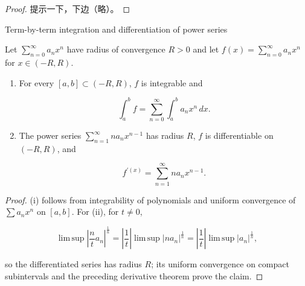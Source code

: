 \begin{proof}

提示一下，下边（略）。

\end{proof}

\begin{theorem}{Term-by-term integration and differentiation of power series}

Let \(\sum_{n = 0}^{\infty}a_{n}x^{n}\) have radius of convergence \(R > 0\) and let \(f(x) = \sum_{n = 0}^{\infty}a_{n}x^{n}\) for \(x \in \left( {- R,R} \right)\).

\begin{enumerate}
\item
  For every \(\left\lbrack {a,b} \right\rbrack \subset \left( {- R,R} \right)\), \(f\) is integrable and

  \[\int_{a}^{b}f = \sum\limits_{n = 0}^{\infty}\int_{a}^{b}a_{n}x^{n}\, dx.\]
\item
  The power series \(\sum_{n = 1}^{\infty}na_{n}x^{n - 1}\) has radius \(R\), \(f\) is differentiable on \(\left( {- R,R} \right)\), and

  \[f^{'{(x)}} = \sum\limits_{n = 1}^{\infty}na_{n}x^{n - 1}.\]
\end{enumerate}

\end{theorem}

\begin{proof}

(i) follows from integrability of polynomials and uniform convergence of \(\sum a_{n}x^{n}\) on \(\left\lbrack {a,b} \right\rbrack\). For (ii), for \(t \neq 0\),

\[\operatorname{lim\, sup}\left| {\frac{n}{t}a_{n}} \right|^{\frac{1}{n}} = \left| \frac{1}{t} \right|\operatorname{lim\, sup}\left| {na_{n}} \right|^{\frac{1}{n}} = \left| \frac{1}{t} \right|\operatorname{lim\, sup}\left| a_{n} \right|^{\frac{1}{n}},\]

so the differentiated series has radius \(R\); its uniform convergence on compact subintervals and the preceding derivative theorem prove the claim.

\end{proof}

